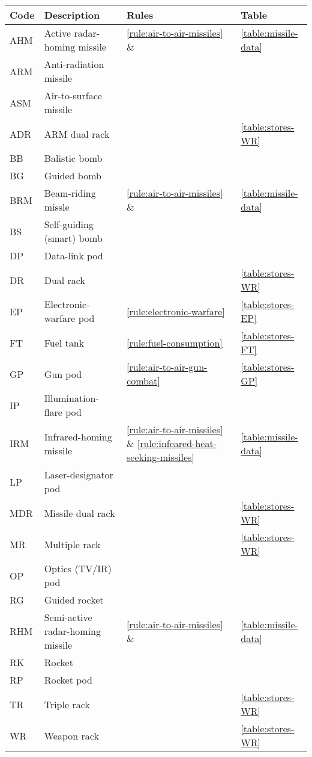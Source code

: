 \begin{twocolumntable}[t]

\begin{tabular}{llll}
\toprule
Code&Description&Rules&Table\\
\midrule
AHM&Active radar-homing missile&\ref{rule:air-to-air-missiles} \& \x{\ref{rule:active-radar-homing-missiles}}{\ref{rule:radar-guided-missiles}}&\ref{table:missile-data}\\
ARM&Anti-radiation missile\\
ASM&Air-to-surface missile\\
ADR&ARM dual rack&&\ref{table:stores-WR}\\
BB&Balistic bomb\\
BG&Guided bomb\\
BRM&Beam-riding missle&\ref{rule:air-to-air-missiles} \& \x{\ref{rule:beam-riding-missiles}}{\ref{rule:radar-guided-missiles}}&\ref{table:missile-data}\\
BS&Self-guiding (smart) bomb\\
DP&Data-link pod\\
DR&Dual rack&&\ref{table:stores-WR}\\
EP&Electronic-warfare pod&\ref{rule:electronic-warfare}&\ref{table:stores-EP}\\
FT&Fuel tank&\ref{rule:fuel-consumption}&\ref{table:stores-FT}\\
GP&Gun pod&\ref{rule:air-to-air-gun-combat}&\ref{table:stores-GP}\\
IP&Illumination-flare pod\\
IRM&Infrared-homing missile&\ref{rule:air-to-air-missiles} \& \ref{rule:infeared-heat-seeking-missiles}&\ref{table:missile-data}\\
LP&Laser-designator pod\\
MDR&Missile dual rack&&\ref{table:stores-WR}\\
MR&Multiple rack&&\ref{table:stores-WR}\\
OP&Optics (TV/IR) pod\\
RG&Guided rocket\\
RHM&Semi-active radar-homing missile&\ref{rule:air-to-air-missiles} \& \x{\ref{rule:semi-active-radar-homing-missiles}}{\ref{rule:radar-guided-missiles}}&\ref{table:missile-data}\\
RK&Rocket\\
RP&Rocket pod\\
TR&Triple rack&&\ref{table:stores-WR}\\
WR&Weapon rack&&\ref{table:stores-WR}\\
\bottomrule
\end{tabular}

\end{twocolumntable}